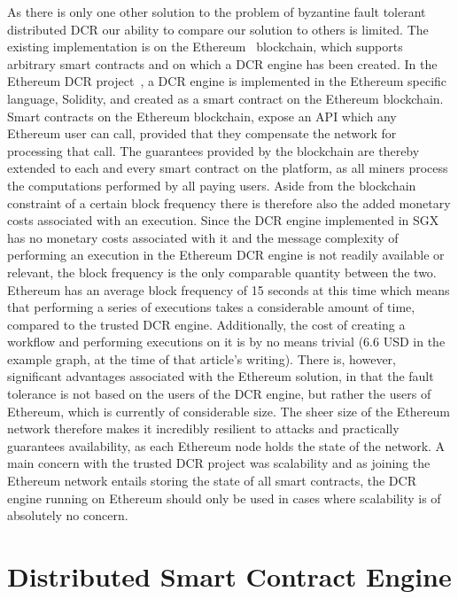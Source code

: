 \documentclass{article}
\begin{document}
	As there is only one other solution to the problem of byzantine fault tolerant distributed DCR our ability to compare our solution to others is limited.
	The existing implementation is on the Ethereum~\cite{_ethereum_2018} blockchain, which supports arbitrary smart contracts and on which a DCR engine has been created.
	In the Ethereum DCR project~\cite{madsen_collaboration_2018}, a DCR engine is implemented in the Ethereum specific language, Solidity, and created as a smart contract on the Ethereum blockchain.
	Smart contracts on the Ethereum blockchain, expose an API which any Ethereum user can call, provided that they compensate the network for processing that call.
	The guarantees provided by the blockchain are thereby extended to each and every smart contract on the platform, as all miners process the computations performed by all paying users.
	Aside from the blockchain constraint of a certain block frequency there is therefore also the added monetary costs associated with an execution.
	Since the DCR engine implemented in SGX has no monetary costs associated with it and the message complexity of performing an execution in the Ethereum DCR engine is not readily available or relevant, the block frequency is the only comparable quantity between the two.
	Ethereum has an average block frequency of 15 seconds at this time which means that performing a series of executions takes a considerable amount of time, compared to the trusted DCR engine.
	Additionally, the cost of creating a workflow and performing executions on it is by no means trivial (6.6 USD in the example graph, at the time of that article's writing).
	There is, however, significant advantages associated with the Ethereum solution, in that the fault tolerance is not based on the users of the DCR engine, but rather the users of Ethereum, which is currently of considerable size.
	The sheer size of the Ethereum network therefore makes it incredibly resilient to attacks and practically guarantees availability, as each Ethereum node holds the state of the network.
	A main concern with the trusted DCR project was scalability and as joining the Ethereum network entails storing the state of all smart contracts, the DCR engine running on Ethereum should only be used in cases where scalability is of absolutely no concern.

	\section{Distributed Smart Contract Engine}
\end{document}
